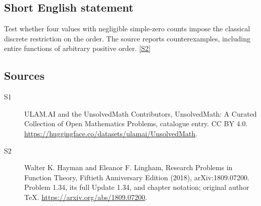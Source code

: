 \documentclass[11pt]{article}
\newcommand{\sref}[2]{\hyperlink{source:#1:#2}{[S#2]}}
\begin{document}
\subsection{Short English statement}
Test whether four values with negligible simple-zero counts impose the classical discrete restriction on the order. The source reports counterexamples, including entire functions of arbitrary positive order. \sref{statement}{2}
\subsection{Sources}
\begin{description}
\item[\hypertarget{source:statement:1}{S1}] ULAM.AI and the UnsolvedMath Contributors, UnsolvedMath: A Curated Collection of Open Mathematics Problems, catalogue entry. CC BY 4.0. \url{https://huggingface.co/datasets/ulamai/UnsolvedMath}.
\item[\hypertarget{source:statement:2}{S2}] Walter K. Hayman and Eleanor F. Lingham, Research Problems in Function Theory, Fiftieth Anniversary Edition (2018), arXiv:1809.07200. Problem 1.34, its full Update 1.34, and chapter notation; original author TeX. \url{https://arxiv.org/abs/1809.07200}.
\end{description}
\label{end:statement}
\end{document}
